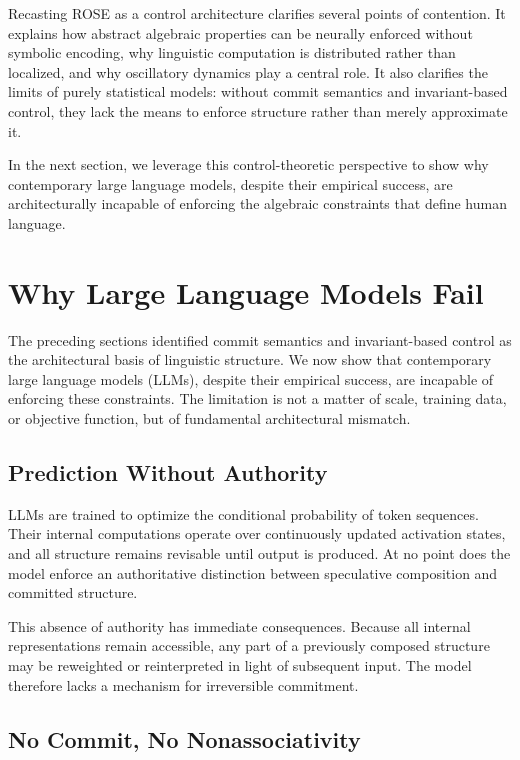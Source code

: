 \documentclass[11pt]{article}
\begin{document}
Recasting ROSE as a control architecture clarifies several points of contention. It explains how abstract algebraic properties can be neurally enforced without symbolic encoding, why linguistic computation is distributed rather than localized, and why oscillatory dynamics play a central role. It also clarifies the limits of purely statistical models: without commit semantics and invariant-based control, they lack the means to enforce structure rather than merely approximate it.

In the next section, we leverage this control-theoretic perspective to show why contemporary large language models, despite their empirical success, are architecturally incapable of enforcing the algebraic constraints that define human language.

\section{Why Large Language Models Fail}
\label{sec:llm_failure}

The preceding sections identified commit semantics and invariant-based control as the architectural basis of linguistic structure. We now show that contemporary large language models (LLMs), despite their empirical success, are incapable of enforcing these constraints. The limitation is not a matter of scale, training data, or objective function, but of fundamental architectural mismatch.

\subsection{Prediction Without Authority}

LLMs are trained to optimize the conditional probability of token sequences. Their internal computations operate over continuously updated activation states, and all structure remains revisable until output is produced. At no point does the model enforce an authoritative distinction between speculative composition and committed structure.

This absence of authority has immediate consequences. Because all internal representations remain accessible, any part of a previously composed structure may be reweighted or reinterpreted in light of subsequent input. The model therefore lacks a mechanism for irreversible commitment.

\subsection{No Commit, No Nonassociativity}
\end{document}
